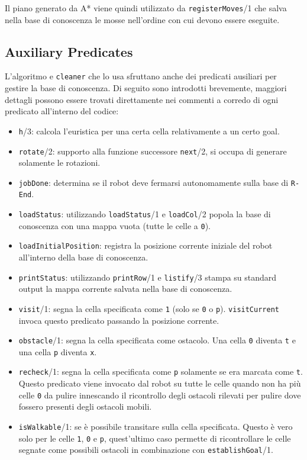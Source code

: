 Il piano generato da A* viene quindi utilizzato da \texttt{registerMoves}/1 che salva nella base di conoscenza le mosse nell'ordine con cui devono essere eseguite.

\subsection{Auxiliary Predicates}
L'algoritmo e \texttt{cleaner} che lo usa sfruttano anche dei predicati ausiliari per gestire la base di conoscenza. Di seguito sono introdotti brevemente, maggiori dettagli possono essere trovati direttamente nei commenti a corredo di ogni predicato all'interno del codice:
\begin{itemize}
	\item \texttt{h}/3: calcola l'euristica per una certa cella relativamente a un certo goal.
	\item \texttt{rotate}/2: supporto alla funzione successore \texttt{next}/2, si occupa di generare solamente le rotazioni.
	\item \texttt{jobDone}: determina se il robot deve fermarsi autonomamente sulla base di \texttt{R-End}.
	\item \texttt{loadStatus}: utilizzando \texttt{loadStatus}/1 e \texttt{loadCol}/2 popola la base di conoscenza con una mappa vuota (tutte le celle a \texttt{0}).
	\item \texttt{loadInitialPosition}: registra la posizione corrente iniziale del robot all'interno della base di conoscenza.
	\item \texttt{printStatus}: utilizzando \texttt{printRow}/1 e \texttt{listify}/3 stampa su standard output la mappa corrente salvata nella base di conoscenza.
	\item \texttt{visit}/1: segna la cella specificata come \texttt{1} (solo se \texttt{0} o \texttt{p}). \texttt{visitCurrent} invoca questo predicato passando la posizione corrente.
	\item \texttt{obstacle}/1: segna la cella specificata come ostacolo. Una cella \texttt{0} diventa \texttt{t} e una cella \texttt{p} diventa \texttt{x}.
	\item \texttt{recheck}/1: segna la cella specificata come \texttt{p} solamente se era marcata come \texttt{t}. Questo predicato viene invocato dal robot su tutte le celle quando non ha più celle \texttt{0} da pulire innescando il ricontrollo degli ostacoli rilevati per pulire dove fossero presenti degli ostacoli mobili.
	\item \texttt{isWalkable}/1: se è possibile transitare sulla cella specificata. Questo è vero solo per le celle \texttt{1}, \texttt{0} e \texttt{p}, quest'ultimo caso permette di ricontrollare le celle segnate come possibili ostacoli in combinazione con \texttt{establishGoal}/1.

\end{itemize}
